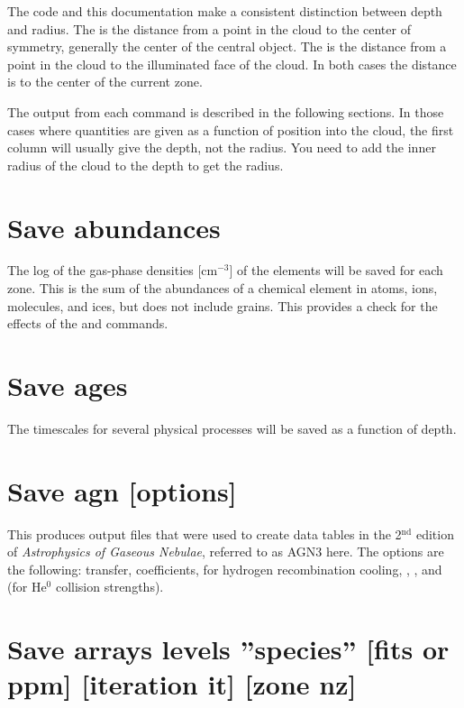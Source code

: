 The code and this documentation make a consistent distinction between
depth and radius.
The 
is the distance from a point in the cloud to the center of symmetry,
generally the center of the central object.
The  is the distance from
a point in the cloud to the illuminated face of the cloud.
In both cases
the distance is to the center of the current zone.

The output from each  command is described in the following sections.
In those cases where quantities are given as a function of position into
the cloud, the first column will usually give the depth, not the radius.
You need to add the inner radius of the cloud to the depth to get the radius.

\section{Save abundances}

The log of the gas-phase densities [cm$^{-3}$] of the elements will be saved
for each zone.
This is the sum of the abundances of a chemical element
in atoms, ions, molecules, and ices, but does not include grains.
This provides a check for the effects of the 
and  commands.

\section{Save ages}

The timescales for several physical processes will be saved as a
function of depth.

\section{Save agn [options]}

This produces output files that were used to create data tables in the
2$^{\mathrm{nd}}$ edition of \emph{Astrophysics of Gaseous Nebulae}, referred to as AGN3 here.
The options are the following:   transfer,
 coefficients,
 for hydrogen recombination cooling, ,
, and  (for He$^0$
collision strengths).

\section{Save arrays levels ''species'' [fits or ppm] [iteration it] [zone nz]}

